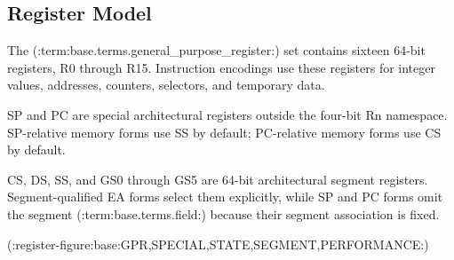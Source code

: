 \subsection{Register Model}\label{section:register-model}
The (:term:base.terms.general_purpose_register:) set contains sixteen 64-bit registers, R0 through R15. Instruction encodings use these
registers for integer values, addresses, counters, selectors, and temporary data.

SP and PC are special architectural registers outside the four-bit Rn namespace. SP-relative memory forms use SS by
default; PC-relative memory forms use CS by default.

CS, DS, SS, and GS0 through GS5 are 64-bit architectural segment registers. Segment-qualified EA forms select them
explicitly, while SP and PC forms omit the segment (:term:base.terms.field:) because their segment association is fixed.

(:register-figure:base:GPR,SPECIAL,STATE,SEGMENT,PERFORMANCE:)
